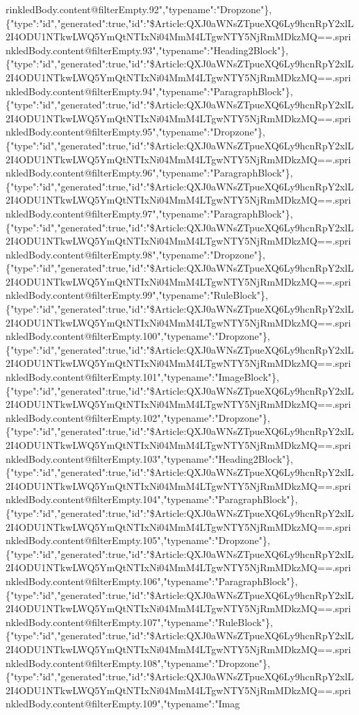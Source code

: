 rinkledBody.content@filterEmpty.92","typename":"Dropzone"\},\{"type":"id","generated":true,"id":"\$Article:QXJ0aWNsZTpueXQ6Ly9hcnRpY2xlL2I4ODU1NTkwLWQ5YmQtNTIxNi04MmM4LTgwNTY5NjRmMDkzMQ==.sprinkledBody.content@filterEmpty.93","typename":"Heading2Block"\},\{"type":"id","generated":true,"id":"\$Article:QXJ0aWNsZTpueXQ6Ly9hcnRpY2xlL2I4ODU1NTkwLWQ5YmQtNTIxNi04MmM4LTgwNTY5NjRmMDkzMQ==.sprinkledBody.content@filterEmpty.94","typename":"ParagraphBlock"\},\{"type":"id","generated":true,"id":"\$Article:QXJ0aWNsZTpueXQ6Ly9hcnRpY2xlL2I4ODU1NTkwLWQ5YmQtNTIxNi04MmM4LTgwNTY5NjRmMDkzMQ==.sprinkledBody.content@filterEmpty.95","typename":"Dropzone"\},\{"type":"id","generated":true,"id":"\$Article:QXJ0aWNsZTpueXQ6Ly9hcnRpY2xlL2I4ODU1NTkwLWQ5YmQtNTIxNi04MmM4LTgwNTY5NjRmMDkzMQ==.sprinkledBody.content@filterEmpty.96","typename":"ParagraphBlock"\},\{"type":"id","generated":true,"id":"\$Article:QXJ0aWNsZTpueXQ6Ly9hcnRpY2xlL2I4ODU1NTkwLWQ5YmQtNTIxNi04MmM4LTgwNTY5NjRmMDkzMQ==.sprinkledBody.content@filterEmpty.97","typename":"ParagraphBlock"\},\{"type":"id","generated":true,"id":"\$Article:QXJ0aWNsZTpueXQ6Ly9hcnRpY2xlL2I4ODU1NTkwLWQ5YmQtNTIxNi04MmM4LTgwNTY5NjRmMDkzMQ==.sprinkledBody.content@filterEmpty.98","typename":"Dropzone"\},\{"type":"id","generated":true,"id":"\$Article:QXJ0aWNsZTpueXQ6Ly9hcnRpY2xlL2I4ODU1NTkwLWQ5YmQtNTIxNi04MmM4LTgwNTY5NjRmMDkzMQ==.sprinkledBody.content@filterEmpty.99","typename":"RuleBlock"\},\{"type":"id","generated":true,"id":"\$Article:QXJ0aWNsZTpueXQ6Ly9hcnRpY2xlL2I4ODU1NTkwLWQ5YmQtNTIxNi04MmM4LTgwNTY5NjRmMDkzMQ==.sprinkledBody.content@filterEmpty.100","typename":"Dropzone"\},\{"type":"id","generated":true,"id":"\$Article:QXJ0aWNsZTpueXQ6Ly9hcnRpY2xlL2I4ODU1NTkwLWQ5YmQtNTIxNi04MmM4LTgwNTY5NjRmMDkzMQ==.sprinkledBody.content@filterEmpty.101","typename":"ImageBlock"\},\{"type":"id","generated":true,"id":"\$Article:QXJ0aWNsZTpueXQ6Ly9hcnRpY2xlL2I4ODU1NTkwLWQ5YmQtNTIxNi04MmM4LTgwNTY5NjRmMDkzMQ==.sprinkledBody.content@filterEmpty.102","typename":"Dropzone"\},\{"type":"id","generated":true,"id":"\$Article:QXJ0aWNsZTpueXQ6Ly9hcnRpY2xlL2I4ODU1NTkwLWQ5YmQtNTIxNi04MmM4LTgwNTY5NjRmMDkzMQ==.sprinkledBody.content@filterEmpty.103","typename":"Heading2Block"\},\{"type":"id","generated":true,"id":"\$Article:QXJ0aWNsZTpueXQ6Ly9hcnRpY2xlL2I4ODU1NTkwLWQ5YmQtNTIxNi04MmM4LTgwNTY5NjRmMDkzMQ==.sprinkledBody.content@filterEmpty.104","typename":"ParagraphBlock"\},\{"type":"id","generated":true,"id":"\$Article:QXJ0aWNsZTpueXQ6Ly9hcnRpY2xlL2I4ODU1NTkwLWQ5YmQtNTIxNi04MmM4LTgwNTY5NjRmMDkzMQ==.sprinkledBody.content@filterEmpty.105","typename":"Dropzone"\},\{"type":"id","generated":true,"id":"\$Article:QXJ0aWNsZTpueXQ6Ly9hcnRpY2xlL2I4ODU1NTkwLWQ5YmQtNTIxNi04MmM4LTgwNTY5NjRmMDkzMQ==.sprinkledBody.content@filterEmpty.106","typename":"ParagraphBlock"\},\{"type":"id","generated":true,"id":"\$Article:QXJ0aWNsZTpueXQ6Ly9hcnRpY2xlL2I4ODU1NTkwLWQ5YmQtNTIxNi04MmM4LTgwNTY5NjRmMDkzMQ==.sprinkledBody.content@filterEmpty.107","typename":"RuleBlock"\},\{"type":"id","generated":true,"id":"\$Article:QXJ0aWNsZTpueXQ6Ly9hcnRpY2xlL2I4ODU1NTkwLWQ5YmQtNTIxNi04MmM4LTgwNTY5NjRmMDkzMQ==.sprinkledBody.content@filterEmpty.108","typename":"Dropzone"\},\{"type":"id","generated":true,"id":"\$Article:QXJ0aWNsZTpueXQ6Ly9hcnRpY2xlL2I4ODU1NTkwLWQ5YmQtNTIxNi04MmM4LTgwNTY5NjRmMDkzMQ==.sprinkledBody.content@filterEmpty.109","typename":"Imag